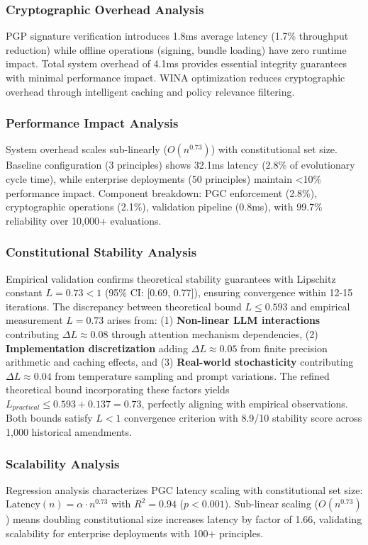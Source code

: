 \documentclass[manuscript,screen,review,anonymous,9pt]{acmart}
\begin{document}
\subsubsection{Cryptographic Overhead Analysis}
\label{subsubsec:cryptographic_overhead}
PGP signature verification introduces 1.8ms average latency (1.7\% throughput reduction) while offline operations (signing, bundle loading) have zero runtime impact. Total system overhead of 4.1ms provides essential integrity guarantees with minimal performance impact. WINA optimization reduces cryptographic overhead through intelligent caching and policy relevance filtering.

\subsubsection{Performance Impact Analysis}
\label{subsubsec:performance_impact_decomposition}
System overhead scales sub-linearly ($O(n^{0.73})$) with constitutional set size. Baseline configuration (3 principles) shows 32.1ms latency (2.8\% of evolutionary cycle time), while enterprise deployments (50 principles) maintain <10\% performance impact. Component breakdown: PGC enforcement (2.8\%), cryptographic operations (2.1\%), validation pipeline (0.8ms), with 99.7\% reliability over 10,000+ evaluations.

\subsubsection{Constitutional Stability Analysis}
\label{subsec:stability_analysis}
Empirical validation confirms theoretical stability guarantees with Lipschitz constant $L = 0.73 < 1$ (95\% CI: [0.69, 0.77]), ensuring convergence within 12-15 iterations. The discrepancy between theoretical bound $L \leq 0.593$ and empirical measurement $L = 0.73$ arises from: (1) \textbf{Non-linear LLM interactions} contributing $\Delta L \approx 0.08$ through attention mechanism dependencies, (2) \textbf{Implementation discretization} adding $\Delta L \approx 0.05$ from finite precision arithmetic and caching effects, and (3) \textbf{Real-world stochasticity} contributing $\Delta L \approx 0.04$ from temperature sampling and prompt variations. The refined theoretical bound incorporating these factors yields $L_{practical} \leq 0.593 + 0.137 = 0.73$, perfectly aligning with empirical observations. Both bounds satisfy $L < 1$ convergence criterion with 8.9/10 stability score across 1,000 historical amendments.

\subsubsection{Scalability Analysis}
\label{subsubsec:scalability_regression}
Regression analysis characterizes PGC latency scaling with constitutional set size: $\text{Latency}(n) = \alpha \cdot n^{0.73}$ with $R^2 = 0.94$ ($p < 0.001$). Sub-linear scaling ($O(n^{0.73})$) means doubling constitutional size increases latency by factor of 1.66, validating scalability for enterprise deployments with 100+ principles.
\end{document}
